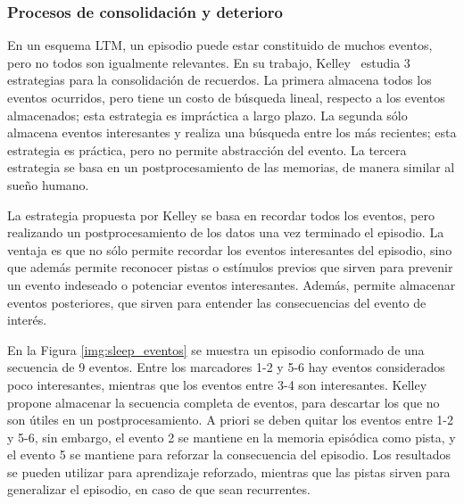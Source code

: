 





\subsubsection{Procesos de consolidación y deterioro}




En un esquema LTM, un episodio puede estar constituido de muchos eventos, pero no todos son igualmente relevantes. En su trabajo, Kelley~\cite{Kelley2014} estudia 3 estrategias para la consolidación de recuerdos. La primera almacena todos los eventos ocurridos, pero tiene un costo de búsqueda lineal, respecto a los eventos almacenados; esta estrategia es impráctica a largo plazo. La segunda sólo almacena eventos interesantes y realiza una búsqueda entre los más recientes; esta estrategia es práctica, pero no permite abstracción del evento. La tercera estrategia se basa en un postprocesamiento de las memorias, de manera similar al sueño humano.

La estrategia propuesta por Kelley se basa en recordar todos los eventos, pero realizando un postprocesamiento de los datos una vez terminado el episodio. La ventaja es que no sólo permite recordar los eventos interesantes del episodio, sino que además permite reconocer pistas o estímulos previos que sirven para prevenir un evento indeseado o potenciar eventos interesantes. Además, permite almacenar eventos posteriores, que sirven para entender las consecuencias del evento de interés. 

En la Figura \ref{img:sleep_eventos} se muestra un episodio conformado de una secuencia de 9 eventos. Entre los marcadores 1-2 y 5-6 hay eventos considerados poco interesantes, mientras que los eventos entre 3-4 son interesantes. Kelley propone almacenar la secuencia completa de eventos, para descartar los que no son útiles en un postprocesamiento. A priori se deben quitar los eventos entre 1-2 y 5-6, sin embargo, el evento 2 se mantiene en la memoria episódica como pista, y el evento 5 se mantiene para reforzar la consecuencia del episodio. Los resultados se pueden utilizar para aprendizaje reforzado, mientras que las pistas sirven para generalizar el episodio, en caso de que sean recurrentes.

